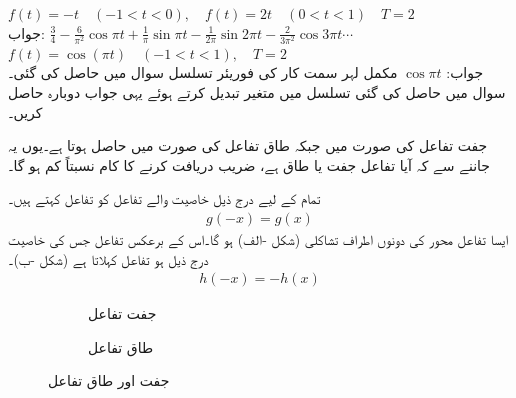 \quad
$f(t)=-t\quad (-1<t<0),\quad f(t)=2t\quad (0<t<1)\quad T=2$\\
جواب:\quad
$\tfrac{3}{4}-\tfrac{6}{\pi^2}\cos \pi t+\tfrac{1}{\pi}\sin \pi t-\tfrac{1}{2\pi}\sin 2\pi t-\tfrac{2}{3\pi^2}\cos 3\pi t\cdots$
\quad
$f(t)=\cos(\pi t)\quad (-1<t<1),\quad T=2$\\
جواب:\quad
$\cos \pi t$
\quad
مکمل لہر سمت کار کی فوریئر تسلسل سوال  میں حاصل کی گئی۔سوال  میں حاصل کی گئی تسلسل میں متغیر تبدیل کرتے ہوئے یہی جواب دوبارہ حاصل کریں۔

جفت تفاعل کی صورت میں  جبکہ طاق تفاعل کی صورت میں  حاصل ہوتا ہے۔یوں یہ جاننے سے کہ آیا تفاعل جفت یا طاق ہے،  ضریب  دریافت کرنے کا کام نسبتاً کم ہو گا۔

تمام  کے لیے درج ذیل خاصیت والے تفاعل  کو  تفاعل کہتے ہیں۔
\begin{align}\label{مساوات_فوریئر_جفت_تعریف}
g(-x)=g(x)
\end{align}
ایسا تفاعل محور  کی دونوں اطراف تشاکلی (شکل -الف) ہو گا۔اس کے برعکس تفاعل  جس کی خاصیت درج ذیل ہو  تفاعل کہلاتا ہے (شکل -ب)۔
\begin{align}\label{مساوات_فوریئر_طاق_تعریف}
h(-x)=-h(x)
\end{align}
%
\begin{figure}
\centering
\begin{subfigure}{0.45\textwidth}
\centering
{}
\caption{ جفت تفاعل}
\end{subfigure} \hfill
\begin{subfigure}{0.45\textwidth}
\centering
{}
\caption{ طاق تفاعل}
\end{subfigure} \hfill
\caption{جفت اور طاق تفاعل}
\label{شکل_فوریئر_جفت_طاق}
\end{figure}

